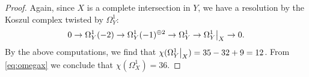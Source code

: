 \begin{proof}
Again, since $X$ is a complete intersection in $Y$, we have a resolution by the Koszul complex twisted by $\Omega_Y^1$:
\[
0 \to \Omega_Y^1(-2) \to \Omega_Y^1(-1)^{\oplus 2} \to \Omega_Y^1 \to \restr{\Omega_Y^1}{X} \to 0.
\]
By the above computations, we find that $\chi(\restr{\Omega_Y^1}{X})=35-32+9=12$. From \eqref{eq:omegax} we conclude that $\chi(\Omega_X^1)=36$.
\end{proof}